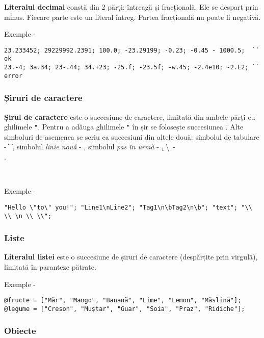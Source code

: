 {\bf Literalul decimal} constă din 2 părți: întreagă și fracțională. Ele se despart prin minus. Fiecare parte este un literal întreg. Partea fracțională nu poate fi negativă.

\noindent Exemple -
\begin{verbatim}
23.233452; 29229992.2391; 100.0; -23.29199; -0.23; -0.45 - 1000.5;  `` ok
23.-4; 3a.34; 23-.44; 34.+23; -25.f; -23.5f; -w.45; -2.4e10; -2.E2; `` error
\end{verbatim}

\subsubsection{Șiruri de caractere}

{\bf Șirul de caractere} este o succesiune de caractere, limitată din ambele părți cu ghilimele \texttt{"}. Pentru a adăuga ghilimele \texttt{"} în șir se folosește succesiunea \texttt{\"}. Alte simboluri de asemenea se scriu ca succesiuni din altele două: simbolul de tabulare - \texttt{\t}, simbolul {\it linie nouă} - \texttt{\n}, simbolul {\it pas în urmă} - \texttt{\b}, \textbackslash \ - \texttt{\\}.

\

\noindent Exemple -
\begin{verbatim}
"Hello \"to\" you!"; "Line1\nLine2"; "Tag1\n\bTag2\n\b"; "text"; "\\ \\ \n \\ \\";
\end{verbatim}

\subsubsection{Liste}

{\bf Literalul listei} este o succesiune de șiruri de caractere (despărțite prin virgulă), limitată în paranteze pătrate.

\noindent Exemple -
\begin{verbatim}
@fructe = ["Măr", "Mango", "Banană", "Lime", "Lemon", "Măslină"];
@legume = ["Creson", "Muștar", "Guar", "Soia", "Praz", "Ridiche"];
\end{verbatim}

\subsubsection{Obiecte}

